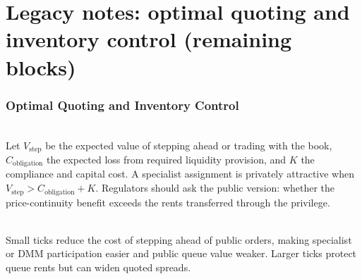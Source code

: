 \documentclass[a4paper,oneside,openany]{book}
\begin{document}
\chapter*{Legacy notes: optimal quoting and inventory control (remaining blocks)}

\subsection*{Optimal Quoting and Inventory Control}


\begin{model} \\
Let $V_{\mathrm{step}}$ be the expected value of stepping ahead or trading with the book, $C_{\mathrm{obligation}}$ the expected loss from required liquidity provision, and $K$ the compliance and capital cost. A specialist assignment is privately attractive when $V_{\mathrm{step}}>C_{\mathrm{obligation}}+K$.
Regulators should ask the public version: whether the price-continuity benefit exceeds the rents transferred through the privilege.
\end{model}

\begin{caveat} \\
Small ticks reduce the cost of stepping ahead of public orders, making specialist or DMM participation easier and public queue value weaker. Larger ticks protect queue rents but can widen quoted spreads.
\end{caveat}
\end{document}
